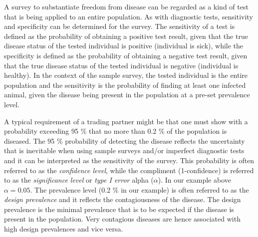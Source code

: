 \documentclass[nojss]{jss}
\begin{document}
A survey to substantiate freedom from disease can be regarded as a kind of test that is being applied to an entire population. As with diagnostic tests, sensitivity and specificity can be determined for the survey. The sensitivity    of a test is defined as the probability of obtaining a positive test result, given that the true disease status of the tested individual is positive (individual is sick), while the specificity  is defined as the probability of obtaining a negative test result, given that the true disease status of the tested individual is negative (individual is healthy). In the context of the sample survey, the tested individual is the entire population and the sensitivity is the probability of finding at least one infected animal, given the disease being present in the population at a pre-set prevalence level.

A typical requirement of a trading partner might be that one must show with a probability exceeding 95 \% that no more than 0.2 \% of the population is diseased. The 95 \% probability of detecting the disease reflects the uncertainty that is inevitable when using sample surveys and/or imperfect diagnostic tests and it can be interpreted as the sensitivity of the survey. This probability is often referred to as the \emph{confidence level},  while the compliment (1-confidence) is referred to as the \emph{significance level}  or   \emph{type I error} alpha ($\alpha$). In our example above $\alpha = 0.05$. The prevalence level (0.2 \% in our example) is often referred to as the \emph{design prevalence}   and it reflects the contagiousness of the disease. The design prevalence is the minimal prevalence that is to be expected if the disease is present in the population. Very contagious diseases are hence associated with high design prevalences and vice versa.
\end{document}
